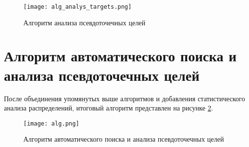 \begin{figure}[ht]
    \centering
    \texttt{[image: alg\_analys\_targets.png]}
    \caption{Алгоритм анализа псевдоточечных целей}
    \label{fig:alg_analys_targets}
\end{figure}

\section{Алгоритм автоматического поиска и анализа псевдоточечных целей}

	После объединения упомянутых выше алгоритмов и добавления статистического анализа распределений, итоговый алгоритм представлен на рисунке \ref{fig:alg}.

\begin{figure}[ht]
    \centering
    \texttt{[image: alg.png]}
    \caption{Алгоритм автоматического поиска и анализа псевдоточечных целей}
    \label{fig:alg}
\end{figure}

\newpage
